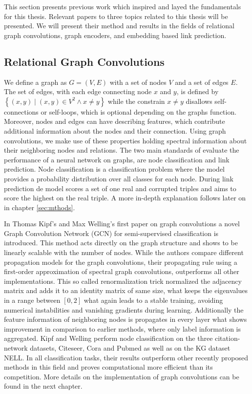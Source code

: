 This section presents previous work which inspired and layed the fundamentals for this thesis. Relevant papers to three topics related to this thesis will be presented. We will present their method and results in the fields of relational graph convolutions, graph encoders, and embedding based link prediction.

\subsection{Relational Graph Convolutions}
We define a graph as $G=(V, E)$  with a set of nodes $V$ and a set of edges $E$. The set of edges, with each edge connecting node $x$ and $y$, is defined by $\left\{(x, y) \mid(x, y) \in V^{2} \wedge x \neq y\right\}$ while the constrain $x \neq y$ disallows self-connections or self-loops, which is optional depending on the graphs function. Moreover, nodes and edges can have describing features, which contribute additional information about the nodes and their connection. Using graph convolutions, we make use of these properties holding spectral information about their neighboring nodes and relations. The two main standards of evaluate the performance of a neural network on graphs, are node classification and link prediction. Node classification is a classification problem where the model provides a probability distribution over all classes for each node. During link prediction de model scores a set of one real and corrupted triples and aims to score the highest on the real triple. A more in-depth explanation follows later on in chapter \ref{sec:mthods}.

In Thomas Kipf's and Max Welling's first paper on graph convolutions \cite{kipf_semi-supervised_2017} a novel Graph Convolution Network (GCN) for semi-supervised classification is introduced. This method acts directly on the graph structure and shows to be linearly scalable with the number of nodes. While the authors compare different propagation models for the graph convolutions, their propagating rule using a first-order approximation of spectral graph convolutions, outperforms all other implementations. This so called renormalization trick normalized the adjacency matrix and adds it to an identity matrix of same size, what keeps the eigenvalues in a range between $[0,2]$ what again leads to a stable training, avoiding numerical instabilities and vanishing gradients during learning. Additionally the feature information of neighboring nodes is propagates in every layer what shows improvement in comparison to earlier methods, where only label information is aggregated.
Kipf and Welling perform node classification on the three citation-network datasets, Citeseer, Cora and Pubmed as well as on the KG dataset NELL. In all classification tasks, their results outperform other recently proposed methods in this field and proves computational more efficient than its competition. More details on the implementation of graph convolutions can be found in the next chapter. 


